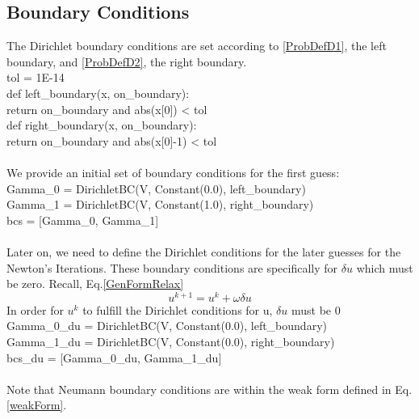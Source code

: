 \documentclass[12pt,3p]{article}
\begin{document}
\subsection{Boundary Conditions}
The Dirichlet boundary conditions are set according to \ref{ProbDefD1}, the left boundary, and \ref{ProbDefD2}, the right boundary. \\
{\selectfont
tol = 1E-14 \\
def left\_boundary(x, on\_boundary): \\
\indent return on\_boundary and abs(x[0]) < tol \\
def right\_boundary(x, on\_boundary): \\
\indent return on\_boundary and abs(x[0]-1) < tol \\ \\
}
We provide an initial set of boundary conditions for the first guess: \\
{\selectfont
Gamma\_0 = DirichletBC(V, Constant(0.0), left\_boundary) \\
Gamma\_1 = DirichletBC(V, Constant(1.0), right\_boundary) \\
bcs = [Gamma\_0, Gamma\_1] \\ \\
}
Later on, we need to define the Dirichlet conditions for the later guesses for the Newton's Iterations. These boundary conditions are specifically for $\delta u$ which must be zero. Recall, Eq.\ref{GenFormRelax} 
\begin{equation*}
u^{k+1} = u^k + \omega \delta u 
\end{equation*}
In order for $u^k$ to fulfill the Dirichlet conditions for u, $\delta u$ must be 0 \\
{\selectfont
Gamma\_0\_du = DirichletBC(V, Constant(0.0), left\_boundary) \\
Gamma\_1\_du = DirichletBC(V, Constant(0.0), right\_boundary) \\
bcs\_du = [Gamma\_0\_du, Gamma\_1\_du] \\ \\
}
Note that Neumann boundary conditions are within the weak form defined in Eq. \ref{weakForm}. 
\end{document}
